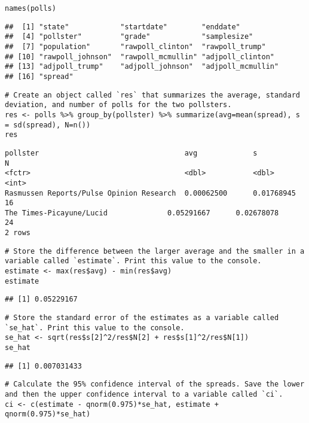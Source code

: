 \documentclass[
]{article}
\begin{document}
\begin{verbatim}
names(polls)
\end{verbatim}

\begin{verbatim}
##  [1] "state"            "startdate"        "enddate"         
##  [4] "pollster"         "grade"            "samplesize"      
##  [7] "population"       "rawpoll_clinton"  "rawpoll_trump"   
## [10] "rawpoll_johnson"  "rawpoll_mcmullin" "adjpoll_clinton" 
## [13] "adjpoll_trump"    "adjpoll_johnson"  "adjpoll_mcmullin"
## [16] "spread"
\end{verbatim}

\begin{verbatim}
# Create an object called `res` that summarizes the average, standard deviation, and number of polls for the two pollsters.
res <- polls %>% group_by(pollster) %>% summarize(avg=mean(spread), s = sd(spread), N=n())
res
\end{verbatim}

\begin{verbatim}
pollster                                  avg             s               N
<fctr>                                    <dbl>           <dbl>           <int>
Rasmussen Reports/Pulse Opinion Research  0.00062500      0.01768945      16
The Times-Picayune/Lucid              0.05291667      0.02678078      24
2 rows
\end{verbatim}

\begin{verbatim}
# Store the difference between the larger average and the smaller in a variable called `estimate`. Print this value to the console.
estimate <- max(res$avg) - min(res$avg)
estimate
\end{verbatim}

\begin{verbatim}
## [1] 0.05229167
\end{verbatim}

\begin{verbatim}
# Store the standard error of the estimates as a variable called `se_hat`. Print this value to the console.
se_hat <- sqrt(res$s[2]^2/res$N[2] + res$s[1]^2/res$N[1])
se_hat
\end{verbatim}

\begin{verbatim}
## [1] 0.007031433
\end{verbatim}

\begin{verbatim}
# Calculate the 95% confidence interval of the spreads. Save the lower and then the upper confidence interval to a variable called `ci`.
ci <- c(estimate - qnorm(0.975)*se_hat, estimate + qnorm(0.975)*se_hat)
\end{verbatim}
\end{document}
